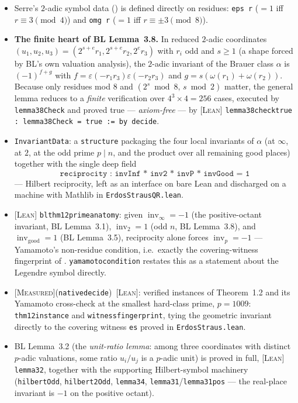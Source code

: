 \documentclass[11pt]{article}
\theoremstyle{plain}
\theoremstyle{definition}
\theoremstyle{remark}
\newcommand{\LEAN}{\textcolor{proved}{\textsc{[Lean]}}}
\newcommand{\MEASURED}{\textcolor{claimed}{\textsc{[Measured]}}}
\newcommand{\file}[1]{\texttt{#1}}
\newcommand{\lean}[1]{\texttt{#1}}
\renewcommand{\_}{\textunderscore\allowbreak}
\newcommand{\inv}{\operatorname{inv}}
\begin{document}
\begin{itemize}[leftmargin=1.4em]
  \item Serre's $2$-adic symbol data (\cite{Serre1973}) is defined directly on residues:
        \lean{eps r} ($=1$ iff $r\equiv 3\pmod 4$) and \lean{omg r} ($=1$ iff
        $r\equiv\pm3\pmod 8$).
  \item \textbf{The finite heart of BL Lemma~3.8.} In reduced $2$-adic coordinates
        $(u_1,u_2,u_3)=(2^{s+e}r_1,2^{s+e}r_2,2^e r_3)$ with $r_i$ odd and $s\ge1$ (a shape
        forced by BL's own valuation analysis), the $2$-adic invariant of the Brauer class
        $\alpha$ is $(-1)^{f+g}$ with $f=\varepsilon(-r_1r_3)\varepsilon(-r_2r_3)$ and
        $g=s(\omega(r_1)+\omega(r_2))$. Because only residues mod $8$ and $(2^s\bmod 8,\,s\bmod
        2)$ matter, the general lemma reduces to a \emph{finite} verification over
        $4^3\times4=256$ cases, executed by \lean{lemma38Check} and proved true —
        \emph{axiom-free} — by \LEAN{} \lean{lemma38\_check\_true : lemma38Check = true := by
        decide}.
  \item \lean{InvariantData}: a \lean{structure} packaging the four local invariants of
        $\alpha$ (at $\infty$, at $2$, at the odd prime $p\mid n$, and the product over all
        remaining good places) together with the single deep field
        \[
        \texttt{reciprocity : invInf * inv2 * invP * invGood = 1}
        \]
        — Hilbert reciprocity, left as an interface on bare Lean and discharged on a machine
        with Mathlib in \file{ErdosStrausQR.lean}.
  \item \LEAN{} \lean{bl\_thm12\_prime\_anatomy}: given $\inv_\infty=-1$ (the positive-octant
        invariant, BL Lemma~3.1), $\inv_2=1$ (odd $n$, BL Lemma~3.8), and $\inv_{\mathrm{good}}=1$
        (BL Lemma~3.5), reciprocity alone forces $\inv_p=-1$ — Yamamoto's non-residue
        condition, i.e.\ exactly the covering-witness fingerprint of .
        \lean{yamamoto\_condition} restates this as a statement about the Legendre symbol
        directly.
  \item \MEASURED (\texttt{native\_decide})~\LEAN{}: verified instances of Theorem~1.2 and its
        Yamamoto cross-check at the smallest hard-class prime, $p=1009$:
        \lean{thm12\_instance\_1009} and \lean{witness\_fingerprint\_1009}, tying the geometric
        invariant directly to the covering witness \lean{es\_1009} proved in
        \file{ErdosStraus.lean}.
  \item BL Lemma~3.2 (the \emph{unit-ratio lemma}: among three coordinates with distinct
        $p$-adic valuations, some ratio $u_i/u_j$ is a $p$-adic unit) is proved in full,
        \LEAN{} \lean{lemma32}, together with the supporting Hilbert-symbol machinery
        (\lean{hilbertOdd}, \lean{hilbert2Odd}, \lean{lemma34}, \lean{lemma31}/\lean{lemma31\_pos}
        — the real-place invariant is $-1$ on the positive octant).
\end{itemize}
\end{document}
